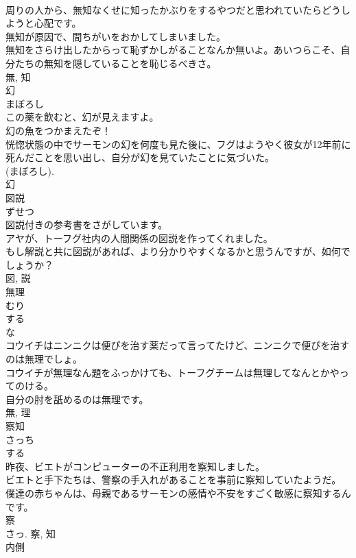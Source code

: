 \documentclass[8pt]{extreport}
\begin{document}
\begin{CJK}{UTF8}{min}
\\	周りの人から、無知なくせに知ったかぶりをするやつだと思われていたらどうしようと心配です。	
\\	無知が原因で、間ちがいをおかしてしまいました。	
\\	無知をさらけ出したからって恥ずかしがることなんか無いよ。あいつらこそ、自分たちの無知を隠していることを恥じるべきさ。	
\\	無, 知	
\\	幻	
\\	まぼろし	
\\	この薬を飲むと、幻が見えますよ。	
\\	幻の魚をつかまえたぞ！	
\\	恍惚状態の中でサーモンの幻を何度も見た後に、フグはようやく彼女が12年前に死んだことを思い出し、自分が幻を見ていたことに気づいた。	
\\	(まぼろし). 
\\	幻	
\\	図説	
\\	ずせつ	
\\	図説付きの参考書をさがしています。	
\\	アヤが、トーフグ社内の人間関係の図説を作ってくれました。	
\\	もし解説と共に図説があれば、より分かりやすくなるかと思うんですが、如何でしょうか？	
\\	図, 説	
\\	無理	
\\	むり	
\\	する 
\\	な 
\\	コウイチはニンニクは便ぴを治す薬だって言ってたけど、ニンニクで便ぴを治すのは無理でしょ。	
\\	コウイチが無理なん題をふっかけても、トーフグチームは無理してなんとかやってのける。	
\\	自分の肘を舐めるのは無理です。	
\\	無, 理	
\\	察知	
\\	さっち	
\\	する 
\\	昨夜、ビエトがコンピューターの不正利用を察知しました。	
\\	ビエトと手下たちは、警察の手入れがあることを事前に察知していたようだ。	
\\	僕達の赤ちゃんは、母親であるサーモンの感情や不安をすごく敏感に察知するんです。	
\\	察 
\\	さっ.	察, 知	
\\	内側	

\end{CJK}
\end{document}
